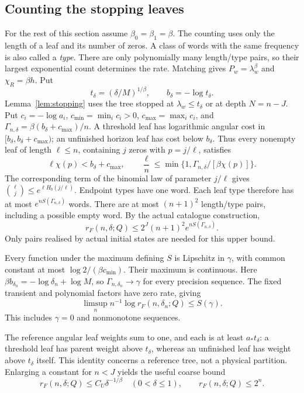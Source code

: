 \documentclass[11pt]{amsart}
\theoremstyle{definition}
\theoremstyle{remark}
\numberwithin{equation}{section}
\begin{document}
\subsection{Counting the stopping leaves}
For the rest of this section assume $\beta_0=\beta_1=\beta$.
The counting uses only the length of a leaf and its number of zeros.
A class of words with the same frequency is also called a
\emph{type}. There are only polynomially many length/type pairs,
so their largest exponential count determines the rate.
Matching gives $P_w=\lambda_w^\beta$ and $\chi_R=\beta h$. Put
\[
t_\delta=(\delta/M)^{1/\beta},\qquad b_\delta=-\log t_\delta.
\]
Lemma~\ref{lem:stopping} uses the tree stopped at
$\lambda_w\le t_\delta$ or at depth $N=n-J$.
Put $c_i=-\log a_i$, $c_{\min}=\min_i c_i>0$,
$c_{\max}=\max_i c_i$, and
$\Gamma_{n,\delta}=\beta(b_\delta+c_{\max})/n$.
A threshold leaf has logarithmic angular cost in
$[b_\delta,b_\delta+c_{\max})$; an unfinished horizon leaf
has cost below $b_\delta$. Thus every nonempty leaf of length
$\ell\le n$, containing $j$ zeros with $p=j/\ell$, satisfies
\begin{equation}\label{eq:leafcost}
\ell\chi(p)<b_\delta+c_{\max},\qquad
\frac{\ell}{n}\le
       \min\{1,\Gamma_{n,\delta}/[\beta\chi(p)]\}.
\end{equation}
The corresponding term of the binomial law of parameter $j/\ell$
gives $\binom{\ell}{j}\le e^{\ell H_b(j/\ell)}$.
Endpoint types have one word. Each leaf type therefore has at most
$e^{nS(\Gamma_{n,\delta})}$ words. There are at most $(n+1)^2$
length/type pairs, including a possible empty word. By the actual
catalogue construction,
\begin{equation}\label{eq:treeupper}
r_F(n,\delta;Q)\le 2^J(n+1)^2e^{nS(\Gamma_{n,\delta})}.
\end{equation}
Only pairs realised by actual initial states are needed for this
upper bound.

Every function under the maximum defining $S$ is Lipschitz in
$\gamma$, with common constant at most
$\log2/(\beta c_{\min})$. Their maximum is continuous.
Here $\beta b_{\delta_n}=-\log\delta_n+\log M$, so
$\Gamma_{n,\delta_n}\to\gamma$ for every precision sequence.
The fixed transient and polynomial factors have zero rate, giving
\begin{equation}\label{eq:spectrumupper}
\limsup_n n^{-1}\log r_F(n,\delta_n;Q)\le S(\gamma).
\end{equation}
This includes $\gamma=0$ and nonmonotone sequences.

The reference angular leaf weights sum to one, and each is at least
$a_*t_\delta$: a threshold leaf has parent weight above $t_\delta$,
whereas an unfinished leaf has weight above $t_\delta$ itself.
This identity concerns a reference tree, not a physical partition.
Enlarging a constant for $n<J$ yields the useful coarse bound
\begin{equation}\label{eq:upper}
r_F(n,\delta;Q)\le C_U\delta^{-1/\beta}
       \quad(0<\delta\le1),\qquad r_F(n,\delta;Q)\le2^n .
\end{equation}
\end{document}

